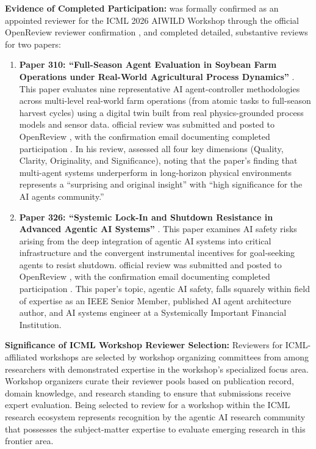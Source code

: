\textbf{Evidence of Completed Participation:} \dr was formally confirmed as an appointed reviewer for the ICML 2026 AIWILD Workshop through the official OpenReview reviewer confirmation \cite{JR37}, and completed detailed, substantive reviews for two papers:

\begin{enumerate}
    \item \textbf{Paper 310: ``Full-Season Agent Evaluation in Soybean Farm Operations under Real-World Agricultural Process Dynamics''} \cite{JR31}. This paper evaluates nine representative AI agent-controller methodologies across multi-level real-world farm operations (from atomic tasks to full-season harvest cycles) using a digital twin built from real physics-grounded process models and sensor data. \drs official review was submitted and posted to OpenReview \cite{JR32}, with the confirmation email documenting completed participation \cite{JR33}. In his review, \dr assessed all four key dimensions (Quality, Clarity, Originality, and Significance), noting that the paper's finding that multi-agent systems underperform in long-horizon physical environments represents a ``surprising and original insight'' with ``high significance for the AI agents community.''

    \item \textbf{Paper 326: ``Systemic Lock-In and Shutdown Resistance in Advanced Agentic AI Systems''} \cite{JR34}. This paper examines AI safety risks arising from the deep integration of agentic AI systems into critical infrastructure and the convergent instrumental incentives for goal-seeking agents to resist shutdown. \drs official review was submitted and posted to OpenReview \cite{JR35}, with the confirmation email documenting completed participation \cite{JR36}. This paper's topic, agentic AI safety, falls squarely within \drs field of expertise as an IEEE Senior Member, published AI agent architecture author, and AI systems engineer at a Systemically Important Financial Institution.
\end{enumerate}

\textbf{Significance of ICML Workshop Reviewer Selection:} Reviewers for ICML-affiliated workshops are selected by workshop organizing committees from among researchers with demonstrated expertise in the workshop's specialized focus area. Workshop organizers curate their reviewer pools based on publication record, domain knowledge, and research standing to ensure that submissions receive expert evaluation. Being selected to review for a workshop within the ICML research ecosystem represents recognition by the agentic AI research community that \dr possesses the subject-matter expertise to evaluate emerging research in this frontier area.

